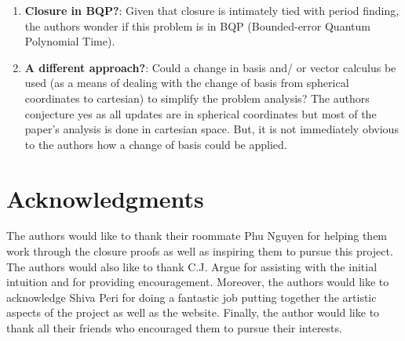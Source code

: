 \documentclass[11pt,titlepage]{article}
\begin{document}
\begin{enumerate}
  \item \textbf{Closure in BQP?}: Given that closure is intimately tied with period finding,
  the authors wonder if this problem is in BQP (Bounded-error Quantum Polynomial Time).

  \item \textbf{A different approach?}: Could a change in basis and/ or vector calculus be used (as a means of dealing 
  with the change of basis from spherical coordinates to cartesian) to simplify the problem analysis?
  The authors conjecture yes as all updates are in spherical coordinates but most of the paper's analysis
  is done in cartesian space. But, it is not immediately obvious to the authors
  how a change of basis could be applied.


\end{enumerate}

\section*{Acknowledgments}
The authors would like to thank their roommate Phu Nguyen for helping them work through the closure proofs
as well as inspiring them to pursue this project. The authors would also like to thank C.J. Argue
for assisting with the initial intuition and for providing encouragement. Moreover, the authors
would like to acknowledge Shiva Peri for doing a fantastic job putting together the artistic aspects
of the project as well as the website. Finally, the author would like to thank all their friends
who encouraged them to pursue their interests.



\newpage




\end{document}

